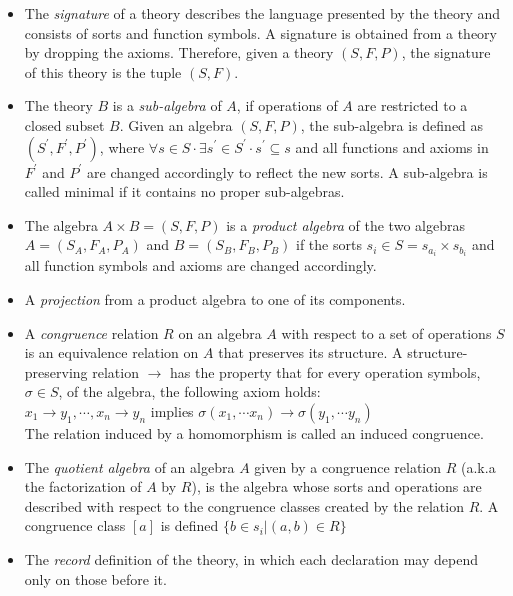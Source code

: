 \begin{itemize}
		\item The \textit{signature} of a theory describes the language presented by the theory and 
		consists of sorts and function symbols. A signature is obtained from a theory by 
		dropping the axioms. Therefore, given a theory $(S,F,P)$, the signature of this theory is the 
		tuple $(S,F)$. 
		\item The theory $B$ is a \textit{sub-algebra} of $A$, if operations of $A$ are restricted to a 
		closed subset $B$. Given an algebra $(S,F,P)$, the sub-algebra is defined as 
		$(S^\prime,F^\prime,P^\prime)$, where 
		$\forall s \in S \cdot \exists s^\prime \in S^\prime \cdot s^\prime \subseteq s$ and all 
		functions and axioms in $F^\prime$ and $P^\prime$ are changed accordingly to reflect the 
		new sorts. A sub-algebra is called minimal if it contains no proper sub-algebras. 
		\item The algebra $A \times B = (S,F,P)$ is a \textit{product algebra} of the two algebras $A = 
		(S_A,F_A,P_A)$ and $B=(S_B,F_B,P_B)$ if the sorts $s_i \in S = s_{a_i} \times s_{b_i}$ and all 
		function symbols and axioms are changed accordingly.   
        \item A \textit{projection} from a product algebra to one of its components. 
        \item A \textit{congruence} relation $R$ on an algebra $A$ with respect to a set of operations $S$ 
        is an equivalence relation on $A$ that preserves its structure. A structure-preserving relation 
        $\rightarrow$ has the property that for every operation symbols, $\sigma \in S$, of the algebra, 
        the following axiom holds: \\
        $x_1 \rightarrow y_1, \cdots, x_n \rightarrow y_n$ implies 
        $\sigma(x_1,\cdots x_n) \rightarrow \sigma(y_1,\cdots y_n)$\\
        The relation induced by a homomorphism is called an induced congruence. 
		\item The \textit{quotient algebra} of an algebra $A$ given by a congruence relation $R$ 
		(a.k.a the factorization of $A$ by $R$), 
		is the algebra whose sorts and operations are described with respect to the 
		congruence classes created by the relation $R$. A congruence class $[a]$ is defined $\{b \in 
		s_i | (a,b) \in R\}$
		\item The \textit{record} definition of the theory, in which each declaration may depend only on 
		those before it. 
		

\end{itemize}
